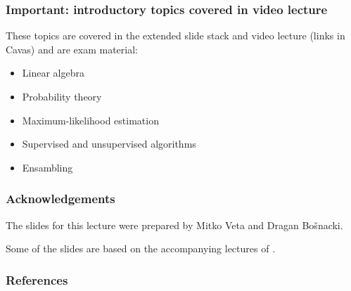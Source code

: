 \documentclass[notes]{beamer}          %
\begin{document}
\begin{frame}
\frametitle{Important: introductory topics covered in video lecture}
These topics are covered in the extended slide stack and video lecture (links in Cavas) and are exam material:
\begin{itemize}
  \item Linear algebra
  \item Probability theory
  \item Maximum-likelihood estimation
  \item Supervised and unsupervised algorithms
  \item Ensambling
\end{itemize}
\end{frame}

\begin{frame}
\frametitle{Acknowledgements}

The slides for this lecture were prepared by Mitko Veta and Dragan Bo{\v s}nacki.

Some of the slides are based on the accompanying lectures of \cite{deeplearning}.

\end{frame}


\begin{frame}
\frametitle{References}
\printbibliography
\end{frame}
\end{document}
